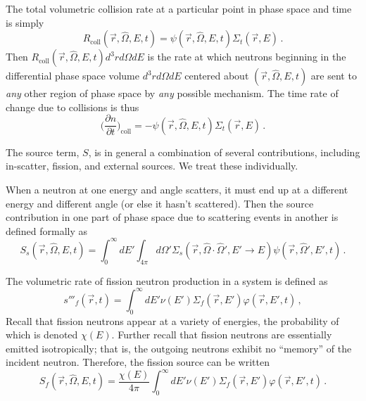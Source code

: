 The total volumetric collision rate at a particular point in phase space 
and time is simply
\begin{equation}
 R_{\text{coll}}(\vec{r},\hat{\Omega},E,t) = \psi(\vec{r},\hat{\Omega},E,t) \Sigma_t(\vec{r},E) \, .
\end{equation}
Then $R_{\text{coll}}(\vec{r},\hat{\Omega},E,t)d^3r d\Omega dE$ is the rate at 
which neutrons beginning in the differential phase space 
volume $d^3r d\Omega dE$ centered about $(\vec{r},\hat{\Omega},E,t)$ are 
sent to \textit{any} other 
region of phase space by \textit{any} possible mechanism.  The time rate of 
change due to collisions is thus
\begin{equation}
 \Big( \frac{\partial n}{\partial t} \Big )_{\mathrm{coll}} 
   = -\psi(\vec{r},\hat{\Omega},E,t) \Sigma_t(\vec{r},E) \, .
\end{equation}

The source term, $S$, is in general a combination of several contributions, 
including in-scatter, fission, and external sources.  We treat these individually.

When a neutron at one energy and angle scatters, it must end up at a different 
energy and different angle (or else it hasn't scattered).  Then the source 
contribution in one part of phase space due to scattering events in another 
is defined formally as
\begin{equation}
 S_s(\vec{r},\hat{\Omega},E,t) = 
   \int^{\infty}_{0} dE' \int_{4\pi} d\Omega' 
     \Sigma_s(\vec{r},\hat{\Omega}\cdot\hat{\Omega}',E'\to E)
     \psi(\vec{r},\hat{\Omega}',E',t) \, .
\label{eq:q_scatter}
\end{equation}

The volumetric rate of fission neutron production in a system is defined as 
\begin{equation}
 s'''_f(\vec{r},t) = \int^{\infty}_{0} dE' \nu(E')\Sigma_f(\vec{r},E')\varphi(\vec{r},E',t) \, ,
\end{equation}
Recall that fission neutrons appear at a variety of energies, the probability of which 
is denoted $\chi(E)$.  Further recall that fission neutrons are essentially emitted 
isotropically; that is, the outgoing neutrons exhibit no ``memory'' of the incident 
neutron.  Therefore, the fission source can be written
\begin{equation}
 S_f(\vec{r},\hat{\Omega},E,t) = 
   \frac{\chi(E)}{4\pi} \int^{\infty}_{0} dE' \nu(E')\Sigma_f(\vec{r},E')\varphi(\vec{r},E',t) \, .
\label{eq:q_fission}
\end{equation}

